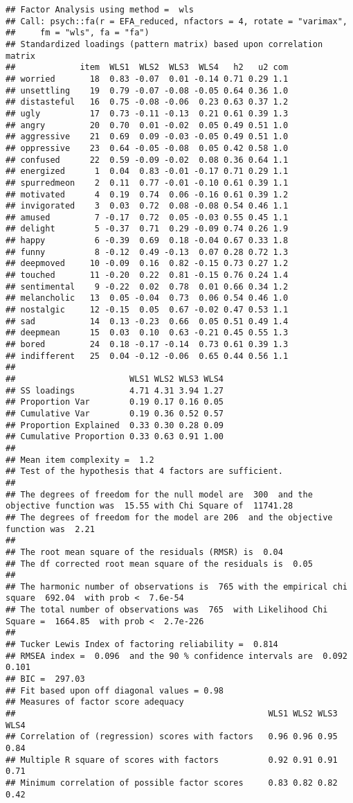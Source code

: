 \documentclass[
]{article}
\begin{document}
\begin{verbatim}
## Factor Analysis using method =  wls
## Call: psych::fa(r = EFA_reduced, nfactors = 4, rotate = "varimax", 
##     fm = "wls", fa = "fa")
## Standardized loadings (pattern matrix) based upon correlation matrix
##             item  WLS1  WLS2  WLS3  WLS4   h2   u2 com
## worried       18  0.83 -0.07  0.01 -0.14 0.71 0.29 1.1
## unsettling    19  0.79 -0.07 -0.08 -0.05 0.64 0.36 1.0
## distasteful   16  0.75 -0.08 -0.06  0.23 0.63 0.37 1.2
## ugly          17  0.73 -0.11 -0.13  0.21 0.61 0.39 1.3
## angry         20  0.70  0.01 -0.02  0.05 0.49 0.51 1.0
## aggressive    21  0.69  0.09 -0.03 -0.05 0.49 0.51 1.0
## oppressive    23  0.64 -0.05 -0.08  0.05 0.42 0.58 1.0
## confused      22  0.59 -0.09 -0.02  0.08 0.36 0.64 1.1
## energized      1  0.04  0.83 -0.01 -0.17 0.71 0.29 1.1
## spurredmeon    2  0.11  0.77 -0.01 -0.10 0.61 0.39 1.1
## motivated      4  0.19  0.74  0.06 -0.16 0.61 0.39 1.2
## invigorated    3  0.03  0.72  0.08 -0.08 0.54 0.46 1.1
## amused         7 -0.17  0.72  0.05 -0.03 0.55 0.45 1.1
## delight        5 -0.37  0.71  0.29 -0.09 0.74 0.26 1.9
## happy          6 -0.39  0.69  0.18 -0.04 0.67 0.33 1.8
## funny          8 -0.12  0.49 -0.13  0.07 0.28 0.72 1.3
## deepmoved     10 -0.09  0.16  0.82 -0.15 0.73 0.27 1.2
## touched       11 -0.20  0.22  0.81 -0.15 0.76 0.24 1.4
## sentimental    9 -0.22  0.02  0.78  0.01 0.66 0.34 1.2
## melancholic   13  0.05 -0.04  0.73  0.06 0.54 0.46 1.0
## nostalgic     12 -0.15  0.05  0.67 -0.02 0.47 0.53 1.1
## sad           14  0.13 -0.23  0.66  0.05 0.51 0.49 1.4
## deepmean      15  0.03  0.10  0.63 -0.21 0.45 0.55 1.3
## bored         24  0.18 -0.17 -0.14  0.73 0.61 0.39 1.3
## indifferent   25  0.04 -0.12 -0.06  0.65 0.44 0.56 1.1
## 
##                       WLS1 WLS2 WLS3 WLS4
## SS loadings           4.71 4.31 3.94 1.27
## Proportion Var        0.19 0.17 0.16 0.05
## Cumulative Var        0.19 0.36 0.52 0.57
## Proportion Explained  0.33 0.30 0.28 0.09
## Cumulative Proportion 0.33 0.63 0.91 1.00
## 
## Mean item complexity =  1.2
## Test of the hypothesis that 4 factors are sufficient.
## 
## The degrees of freedom for the null model are  300  and the objective function was  15.55 with Chi Square of  11741.28
## The degrees of freedom for the model are 206  and the objective function was  2.21 
## 
## The root mean square of the residuals (RMSR) is  0.04 
## The df corrected root mean square of the residuals is  0.05 
## 
## The harmonic number of observations is  765 with the empirical chi square  692.04  with prob <  7.6e-54 
## The total number of observations was  765  with Likelihood Chi Square =  1664.85  with prob <  2.7e-226 
## 
## Tucker Lewis Index of factoring reliability =  0.814
## RMSEA index =  0.096  and the 90 % confidence intervals are  0.092 0.101
## BIC =  297.03
## Fit based upon off diagonal values = 0.98
## Measures of factor score adequacy             
##                                                   WLS1 WLS2 WLS3 WLS4
## Correlation of (regression) scores with factors   0.96 0.96 0.95 0.84
## Multiple R square of scores with factors          0.92 0.91 0.91 0.71
## Minimum correlation of possible factor scores     0.83 0.82 0.82 0.42
\end{verbatim}
\end{document}
